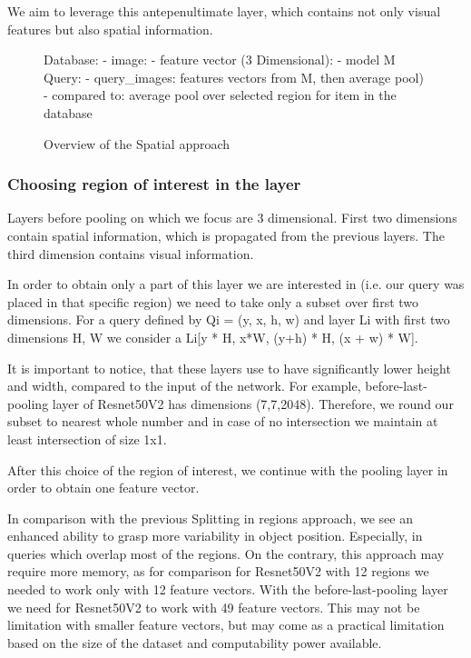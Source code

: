 We aim to leverage this antepenultimate layer, which contains not only visual features but also spatial information.

\begin{figure}
\centering
\begin{boxedverbatim}
Database:
    - image:
        - feature vector (3 Dimensional):
    - model M
Query:
    - query_images: features vectors from M, then average pool)
    - compared to: average pool over selected region for item 
                   in the database
\end{boxedverbatim}
\caption{Overview of the Spatial approach}
\end{figure}


\subsubsection{Choosing region of interest in the layer}

Layers before pooling on which we focus are 3 dimensional. First two dimensions contain spatial information, which is propagated from the previous layers. The third dimension contains visual information.

In order to obtain only a part of this layer we are interested in (i.e. our query was placed in that specific region) we need to take only a subset over first two dimensions. For a query defined by Qi = (y, x, h, w) and layer Li with first two dimensions H, W we consider a Li[y * H, x*W, (y+h) * H, (x + w) * W]. 

It is important to notice, that these layers use to have significantly lower height and width, compared to the input of the network. For example, before-last-pooling layer of Resnet50V2 has dimensions (7,7,2048). Therefore, we round our subset to nearest whole number and in case of no intersection we maintain at least intersection of size 1x1.

After this choice of the region of interest, we continue with the pooling layer in order to obtain one feature vector.

In comparison with the previous Splitting in regions approach, we see an enhanced ability to grasp more variability in object position. Especially, in queries which overlap most of the regions. On the contrary, this approach may require more memory, as for comparison for Resnet50V2 with 12 regions we needed to work only with 12 feature vectors. With the before-last-pooling layer we need for Resnet50V2 to work with 49 feature vectors. This may not be limitation with smaller feature vectors, but may come as a practical limitation based on the size of the dataset and computability power available.


